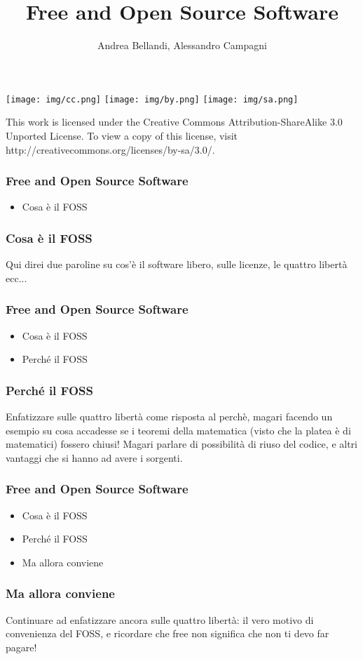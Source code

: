 \documentclass{beamer}
\title{Free and Open Source Software}
\author{Andrea Bellandi, Alessandro Campagni}
\begin{document}
\begin{frame}
  \titlepage

\vfill
\texttt{[image: img/cc.png]}
\texttt{[image: img/by.png]}
\texttt{[image: img/sa.png]}

This work is licensed under the Creative Commons
Attribution-ShareAlike 3.0 Unported License. 
To view a copy of this license, visit 
http://creativecommons.org/licenses/by-sa/3.0/.
\end{frame}

\begin{frame}
  \frametitle{Free and Open Source Software}

  \begin{itemize}
    \item Cosa \`e il FOSS
  \end{itemize}

\end{frame}


\begin{frame}
  \frametitle{Cosa \`e il FOSS}
Qui direi due paroline su cos'\`e il software libero, sulle licenze,
le quattro libert\`a ecc...
\end{frame}

\begin{frame}
  \frametitle{Free and Open Source Software}

  \begin{itemize}
    \item Cosa \`e il FOSS
    \item Perch\'e il FOSS
  \end{itemize}

\end{frame}

\begin{frame}
  \frametitle{Perch\'e il FOSS}
Enfatizzare sulle quattro libert\`a come risposta al perch\`e, magari
facendo un esempio su cosa accadesse se i teoremi della matematica
(visto che la platea \`e di matematici) fossero chiusi! Magari parlare
di possibilit\`a di riuso del codice, e altri vantaggi che si hanno ad
avere i sorgenti.
\end{frame}

\begin{frame}
  \frametitle{Free and Open Source Software}

  \begin{itemize}
    \item Cosa \`e il FOSS
    \item Perch\'e il FOSS
    \item Ma allora conviene
  \end{itemize}

\end{frame}

\begin{frame}
  \frametitle{Ma allora conviene}
Continuare ad enfatizzare ancora sulle quattro libert\`a: il vero
motivo di convenienza del FOSS, e ricordare che free non significa che
non ti devo far pagare!
\end{frame}
\end{document}
